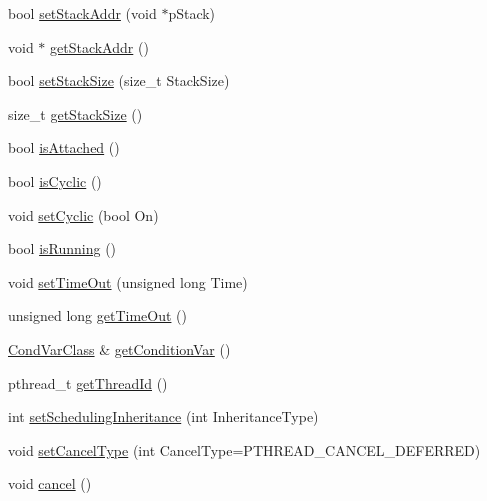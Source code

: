 \begin{DoxyCompactItemize}
\item 
bool \hyperlink{classPThreadClass_a637580a700f744236440695abe689efa}{set\+Stack\+Addr} (void $\ast$p\+Stack)
\item 
void $\ast$ \hyperlink{classPThreadClass_a0ca8d7ebf843ee190c4cfdfe7909d3f5}{get\+Stack\+Addr} ()
\item 
bool \hyperlink{classPThreadClass_a25c4ea5d463a772ee3b916621e388bed}{set\+Stack\+Size} (size\+\_\+t Stack\+Size)
\item 
size\+\_\+t \hyperlink{classPThreadClass_a2c7527172a945ef9b66f414c142bcefd}{get\+Stack\+Size} ()
\item 
bool \hyperlink{classPThreadClass_af2ad966c36b6995587bde14965722ffc}{is\+Attached} ()
\item 
bool \hyperlink{classPThreadClass_a707a99aa60413db5d6e42230f1f63632}{is\+Cyclic} ()
\item 
void \hyperlink{classPThreadClass_ae217dc6602148a3a5be79089089dc807}{set\+Cyclic} (bool On)
\item 
bool \hyperlink{classPThreadClass_a4f88c65bb031c89b2b0efd31c1c37fc5}{is\+Running} ()
\item 
void \hyperlink{classPThreadClass_a88cda74fba292ade7054204a6833e8ac}{set\+Time\+Out} (unsigned long Time)
\item 
unsigned long \hyperlink{classPThreadClass_accc3e3d98e44796d9f78bc16e22c5403}{get\+Time\+Out} ()
\item 
\hyperlink{classCondVarClass}{Cond\+Var\+Class} \& \hyperlink{classPThreadClass_a9a1dc6820222741276087d0323905b4d}{get\+Condition\+Var} ()
\item 
pthread\+\_\+t \hyperlink{classPThreadClass_a28368c1db23e60e2ab7e12acbd8eef83}{get\+Thread\+Id} ()
\item 
int \hyperlink{classPThreadClass_ad79d5e4fe69d0b77f5c16bf83259c3ad}{set\+Scheduling\+Inheritance} (int Inheritance\+Type)
\item 
void \hyperlink{classPThreadClass_a7d320ee54f3a8f26fc4a3245c36f7df6}{set\+Cancel\+Type} (int Cancel\+Type=P\+T\+H\+R\+E\+A\+D\+\_\+\+C\+A\+N\+C\+E\+L\+\_\+\+D\+E\+F\+E\+R\+R\+ED)
\item 
void \hyperlink{classPThreadClass_a6e4fffd986c68d60ef3c089293007eab}{cancel} ()
\end{DoxyCompactItemize}
